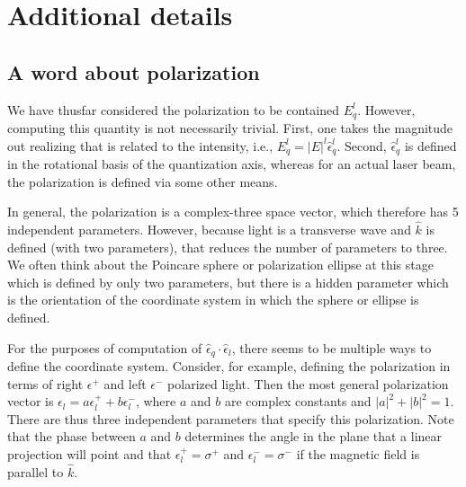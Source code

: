 \documentclass[final,5p,times,twocolumn]{elsarticle}
\begin{document}
\section{Additional details}

\subsection{A word about polarization}
We have thusfar considered the polarization to be contained $E^l_q$.  However,
computing this quantity is not necessarily trivial.  First, one takes the
magnitude out realizing that is related to the intensity, i.e., $E^l_q =
|E|^l\hat{\epsilon}^l_q$.  Second, $\hat{\epsilon}^l_q$ is defined in the
rotational basis of the quantization axis, whereas for an actual laser beam,
the polarization is defined via some other means.

In general, the polarization is a complex-three space vector, which therefore
has 5 independent parameters.  However, because light is a transverse wave and
$\hat{k}$ is defined (with two parameters), that reduces the number of
parameters to three.  We often think about the Poincare sphere or polarization
ellipse at this stage which is defined by only two parameters, but there is a
hidden parameter which is the orientation of the coordinate system in which
the sphere or ellipse is defined.

For the purposes of computation of $\hat{\epsilon}_q\cdot\hat{\epsilon}_l$,
there seems to be multiple ways to define the coordinate system.  Consider, for
example, defining the polarization in terms of right $\epsilon^+$ and left
$\epsilon^-$ polarized light.  Then the most general polarization vector is
$\epsilon_l = a \epsilon^+_l + b \epsilon^-_l$, where $a$ and $b$ are complex
constants and $|a|^2+|b|^2=1$.  There are thus three independent parameters that
specify this polarization.  Note that the phase between $a$ and $b$ determines
the angle in the plane that a linear projection will point and that
$\epsilon^+_l=\sigma^+$ and $\epsilon^-_l=\sigma^-$ if the magnetic field is
parallel to $\hat{k}$.
\end{document}

